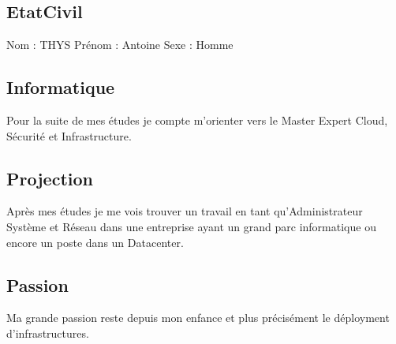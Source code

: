 \documentclass[a4paper,12pt]{article}
\begin{document}
	\subsection*{EtatCivil}
        Nom : THYS
        \newline
        Prénom : Antoine
        \newline
        Sexe : Homme
        \newline

	\subsection*{Informatique}
        Pour la suite de mes études je compte m'orienter vers le Master Expert Cloud, Sécurité et Infrastructure.
        \newline
	
	\subsection*{Projection}
		Après mes études je me vois trouver un travail en tant qu'Administrateur Système et Réseau dans une entreprise ayant un grand parc informatique ou encore un poste dans un Datacenter.
		\newline
	\subsection*{Passion}
		Ma grande passion reste depuis mon enfance et plus précisément le déployment d'infrastructures.
		\newline
\end{document}
